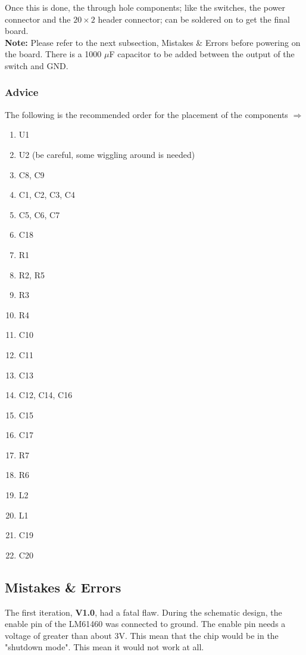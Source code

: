 \documentclass[12pt,a4paper]{article}
\begin{document}
Once this is done, the through hole components; like the switches, the power connector and the $20 \times 2$ header connector; can be soldered on to get the final board.  \\

\textbf{Note:} Please refer to the next subsection, Mistakes \& Errors before powering on the board. There is a 1000 $\mu$F capacitor to be added between the output of the switch and GND.

\subsubsection{Advice}

The following is the recommended order for the placement of the components $\Rightarrow$

\begin{enumerate}
\item U1
\item U2 (be careful, some wiggling around is needed)
\item C8, C9
\item C1, C2, C3, C4
\item C5, C6, C7
\item C18
\item R1
\item R2, R5
\item R3
\item R4
\item C10
\item C11
\item C13
\item C12, C14, C16
\item C15
\item C17
\item R7
\item R6
\item L2
\item L1
\item C19
\item C20
\end{enumerate}

\subsection{Mistakes \& Errors}

The first iteration, \textbf{V1.0}, had a fatal flaw. During the schematic design, the enable pin of the LM61460 was connected to ground. The enable pin needs a voltage of greater than about $3$V. This mean that the chip would be in the "shutdown mode". This mean it would not work at all. \\
\end{document}
